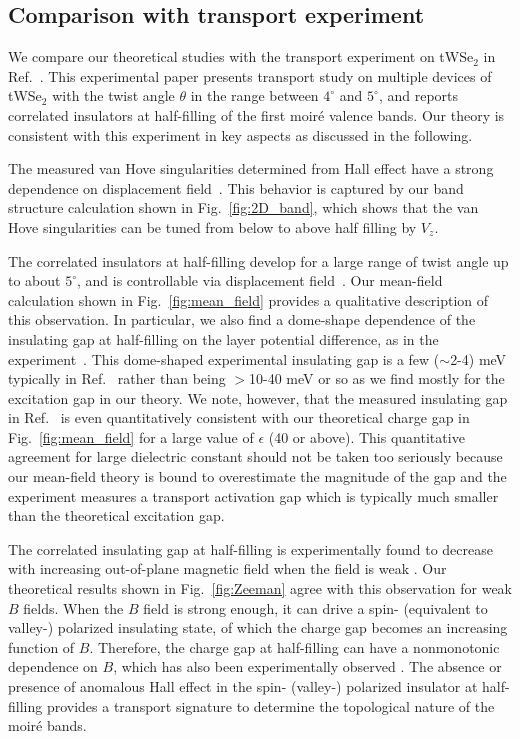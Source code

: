 \documentclass[aps,prx,floatfix,twocolumn]{revtex4-1}
\begin{document}
	
 	
	\subsection{Comparison with transport experiment}
    We compare our theoretical studies with the transport experiment on tWSe$_2$ in Ref.~. This experimental paper \cite{wang2019magic} presents transport study on multiple devices of tWSe$_2$ with the twist angle $\theta$ in the range between $4^{\circ}$ and $5^{\circ}$, and reports correlated insulators at half-filling of the first moir\'e valence bands. Our theory is consistent with this experiment \cite{wang2019magic} in key aspects as discussed in the following. 
    
    The measured van Hove singularities determined from Hall effect have a strong dependence on displacement field~\cite{wang2019magic}. This behavior is captured by our band structure calculation shown in Fig.~\ref{fig:2D_band}, which shows that the van Hove singularities can be tuned from below to above half filling by $V_z$. %
    
    The correlated insulators at half-filling develop for a large range of twist angle up to about $5^{\circ}$, and is controllable via displacement field~\cite{wang2019magic}. Our mean-field calculation shown in Fig.~\ref{fig:mean_field} provides a qualitative description of this observation.  In particular, we also find a dome-shape dependence of the insulating gap at half-filling on the layer potential difference, as in the experiment~\cite{wang2019magic}. This dome-shaped experimental insulating gap is a few ($ \sim $2-4) meV typically in Ref.~ rather than being $ > $10-40 meV or so as we find mostly for the excitation gap in our theory. We note, however, that the measured insulating gap in Ref.~ is even quantitatively consistent with our theoretical charge gap in Fig.~\ref{fig:mean_field} for a large value of $ \epsilon $ (40 or above).  This quantitative agreement for large dielectric constant should not be taken too seriously because our mean-field theory is bound to overestimate the magnitude of the gap and the experiment measures a transport activation gap which is typically much smaller than the theoretical excitation gap.
    
    
    The correlated insulating gap at half-filling is experimentally found to decrease with increasing out-of-plane magnetic field  when the field is weak \cite{wang2019magic}. Our theoretical results shown in Fig.~\ref{fig:Zeeman} agree with this observation for weak $B$ fields. When the $B$ field is strong enough, it can drive a spin- (equivalent to valley-) polarized insulating state, of which the charge gap becomes an increasing function of $B$. Therefore, the charge gap at half-filling can have a nonmonotonic dependence on $B$, which has also been experimentally observed \cite{wang2020private}. The absence or presence of anomalous Hall effect in the spin- (valley-) polarized insulator at half-filling provides a transport signature to determine the topological nature of the moir\'e bands. 
    
\end{document}
